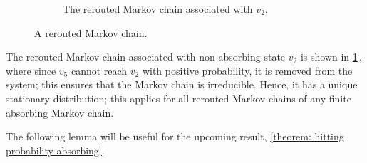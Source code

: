 \begin{example}
\begin{figure}[htbp]
\begin{subfigure}{\textwidth}
        \caption{The rerouted Markov chain associated with $v_2$.}
        \label{subfig: ex rerouted 2}
    \end{subfigure}
    \caption{A rerouted Markov chain.}
    \label{fig: ex rerouted}
\end{figure}
The rerouted Markov chain associated with non-absorbing state $v_2$ 
is shown in \cref{subfig: ex rerouted 2}\,, 
where since $v_5$ cannot reach $v_2$ with positive probability, 
it is removed from the system; this ensures that the Markov chain is irreducible.
Hence, it has a unique stationary distribution; this applies for all rerouted Markov chains of any finite absorbing Markov chain.
\end{example}

The following lemma will be useful for the upcoming result, \cref{theorem: hitting probability absorbing}.

